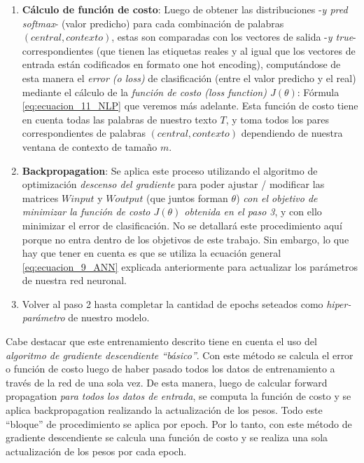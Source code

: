 \documentclass[12pt,a4paper]{article}
\begin{document}
\begin{sloppypar}
\begin{enumerate}
\begin{itemize}
\end{itemize}

\item \textbf{Cálculo de función de costo}:  Luego de obtener las distribuciones -\textit{y pred softmax}- (valor predicho) para cada combinación de palabras $(central, contexto)$, estas son comparadas con los vectores de salida -\textit{y true}- correspondientes (que tienen las etiquetas reales y al igual que los vectores de entrada están codificados en formato one hot encoding), computándose de esta manera el \textit{error (o loss)} de clasificación (entre el valor predicho y el real) mediante el cálculo de la \textit{función de costo (loss function) $J(\theta)$}: Fórmula \ref{eq:ecuacion_11_NLP} que veremos más adelante. Esta función de costo tiene en cuenta todas las palabras de nuestro texto $T$, y toma todos los pares correspondientes de palabras $(central, contexto)$ dependiendo de nuestra ventana de contexto de tamaño $m$.

\item \textbf{Backpropagation}: Se aplica este proceso utilizando el algoritmo de optimización \textit{descenso del gradiente} para poder ajustar / modificar las matrices $W input$ y $W output$  (que juntos forman $\theta$) \textit{con el objetivo de minimizar la función de costo $J(\theta)$ obtenida en el paso 3}, y con ello minimizar el error de clasificación. No se detallará este procedimiento aquí porque no entra dentro de los objetivos de este trabajo. Sin embargo, lo que hay que tener en cuenta es que se utiliza la ecuación general \ref{eq:ecuacion_9_ANN} explicada anteriormente para actualizar los parámetros de nuestra red neuronal. 

\item Volver al paso 2 hasta completar la cantidad de epochs seteados como \textit{hiper-parámetro} de nuestro modelo. 

\end{enumerate}

Cabe destacar que este entrenamiento descrito tiene en cuenta el uso del \textit{algoritmo de gradiente descendiente “básico”}. Con este método se calcula el error o función de costo luego de haber pasado todos los datos de entrenamiento a través de la red de una sola vez. De esta manera, luego de calcular forward propagation \textit{para todos los datos de entrada}, se computa la función de costo y se aplica backpropagation realizando la actualización de los pesos. Todo este “bloque” de procedimiento se aplica por epoch. Por lo tanto, con este método de gradiente descendiente se calcula una función de costo y se realiza una sola actualización de los pesos por cada epoch.


\end{sloppypar}
\end{document}
